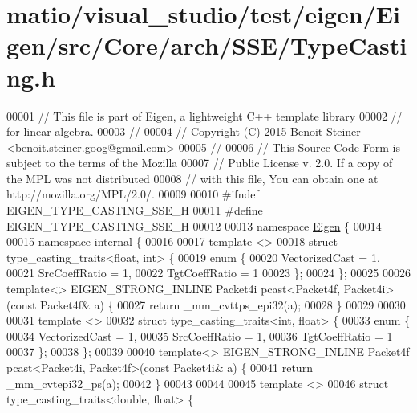 \hypertarget{matio_2visual__studio_2test_2eigen_2_eigen_2src_2_core_2arch_2_s_s_e_2_type_casting_8h_source}{}\section{matio/visual\+\_\+studio/test/eigen/\+Eigen/src/\+Core/arch/\+S\+S\+E/\+Type\+Casting.h}
\label{matio_2visual__studio_2test_2eigen_2_eigen_2src_2_core_2arch_2_s_s_e_2_type_casting_8h_source}

\begin{DoxyCode}
00001 \textcolor{comment}{// This file is part of Eigen, a lightweight C++ template library}
00002 \textcolor{comment}{// for linear algebra.}
00003 \textcolor{comment}{//}
00004 \textcolor{comment}{// Copyright (C) 2015 Benoit Steiner <benoit.steiner.goog@gmail.com>}
00005 \textcolor{comment}{//}
00006 \textcolor{comment}{// This Source Code Form is subject to the terms of the Mozilla}
00007 \textcolor{comment}{// Public License v. 2.0. If a copy of the MPL was not distributed}
00008 \textcolor{comment}{// with this file, You can obtain one at http://mozilla.org/MPL/2.0/.}
00009 
00010 \textcolor{preprocessor}{#ifndef EIGEN\_TYPE\_CASTING\_SSE\_H}
00011 \textcolor{preprocessor}{#define EIGEN\_TYPE\_CASTING\_SSE\_H}
00012 
00013 \textcolor{keyword}{namespace }\hyperlink{namespace_eigen}{Eigen} \{
00014 
00015 \textcolor{keyword}{namespace }\hyperlink{namespaceinternal}{internal} \{
00016 
00017 \textcolor{keyword}{template} <>
00018 \textcolor{keyword}{struct }type\_casting\_traits<float, int> \{
00019   \textcolor{keyword}{enum} \{
00020     VectorizedCast = 1,
00021     SrcCoeffRatio = 1,
00022     TgtCoeffRatio = 1
00023   \};
00024 \};
00025 
00026 \textcolor{keyword}{template}<> EIGEN\_STRONG\_INLINE Packet4i pcast<Packet4f, Packet4i>(\textcolor{keyword}{const} Packet4f& a) \{
00027   \textcolor{keywordflow}{return} \_mm\_cvttps\_epi32(a);
00028 \}
00029 
00030 
00031 \textcolor{keyword}{template} <>
00032 \textcolor{keyword}{struct }type\_casting\_traits<int, float> \{
00033   \textcolor{keyword}{enum} \{
00034     VectorizedCast = 1,
00035     SrcCoeffRatio = 1,
00036     TgtCoeffRatio = 1
00037   \};
00038 \};
00039 
00040 \textcolor{keyword}{template}<> EIGEN\_STRONG\_INLINE Packet4f pcast<Packet4i, Packet4f>(\textcolor{keyword}{const} Packet4i& a) \{
00041   \textcolor{keywordflow}{return} \_mm\_cvtepi32\_ps(a);
00042 \}
00043 
00044 
00045 \textcolor{keyword}{template} <>
00046 \textcolor{keyword}{struct }type\_casting\_traits<double, float> \{

\end{DoxyCode}
